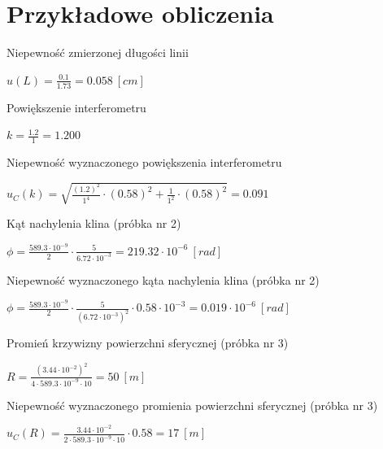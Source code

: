 \documentclass[12pt, a4paper, oneside]{article}
\begin{document}
\section{Przykładowe obliczenia}
Niepewność zmierzonej długości linii
\begin{center}
$u(L)=\frac{0.1}{1.73}=0.058~[cm]$
\end{center}
Powiększenie interferometru
\begin{center}
$k=\frac{1.2}{1}=1.200$
\end{center}
Niepewność wyznaczonego powiększenia interferometru
\begin{center}
$u_C(k)=\sqrt{\frac{(1.2)^2}{1^4}\cdot(0.58)^2+\frac{1}{1^2}\cdot(0.58)^2}=0.091$
\end{center}
Kąt nachylenia klina (próbka nr 2)
\begin{center}
$\phi=\frac{589.3 \cdot 10^{-9}}{2}\cdot\frac{5}{6.72 \cdot 10^{-3}}=219.32 \cdot 10^{-6}~[rad]$
\end{center}
Niepewność wyznaczonego kąta nachylenia klina (próbka nr 2)
\begin{center}
$\phi=\frac{589.3 \cdot 10^{-9}}{2}\cdot\frac{5}{(6.72 \cdot 10^{-3})^2}\cdot 0.58\cdot10^{-3}=0.019\cdot 10^{-6}~[rad]$
\end{center}
Promień krzywizny powierzchni sferycznej (próbka nr 3)
\begin{center}
$R=\frac{(3.44\cdot10^{-2})^2}{4\cdot589.3\cdot10^{-9}\cdot10}=50~[m]$
\end{center}
Niepewność wyznaczonego promienia powierzchni sferycznej (próbka nr 3)
\begin{center}
$u_C(R)=\frac{3.44\cdot10^{-2}}{2\cdot589.3\cdot10^{-9}\cdot10}\cdot 0.58=17~[m]$
\end{center}
\clearpage
\end{document}
